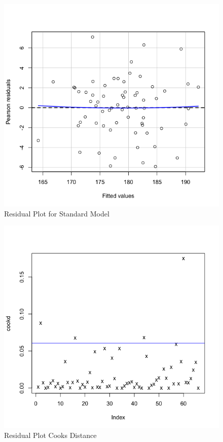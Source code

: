 \documentclass[12pt]{article}
\makeatletter
\theoremstyle{homework}
\newenvironment{exercise}[1]
{\def\@currentlabel{#1}\exercisecore}
{\endexercisecore}
\makeatother
\begin{document}
\begin{exercise}{10.4}
\begin{figure}[H]
\begin{center}
    \end{center}
  \end{figure}
  \begin{figure}[H]
    \begin{center}
    \caption{Residual Plot for Standard Model}
    \includegraphics[width = \textwidth]{ResidualPlotModel.png}
    \end{center}
  \end{figure}
  \begin{figure}[H]
    \begin{center}
    \caption{Residual Plot Cooks Distance}
    \includegraphics[width = \textwidth]{CooksDModel.png}

\end{center}
\end{figure}
\end{exercise}
\end{document}
